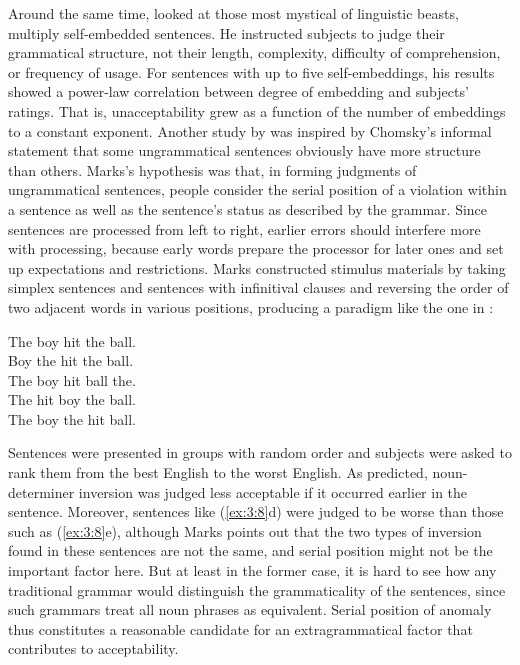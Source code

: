 Around the same time, \citet{Marks1968} looked at those most mystical of linguistic beasts, multiply self-embedded sentences. He instructed subjects to judge their grammatical structure, not their length, complexity, difficulty of comprehension, or frequency of usage. For sentences with up to five self-embeddings, his results showed a power-law correlation between degree of embedding and subjects' ratings. That is, unacceptability grew as a function of the number of embeddings to a constant exponent. Another study by \citet{Marks1965,Marks1967} was inspired by Chomsky's informal statement that some ungrammatical sentences obviously have more structure than others. Marks's hypothesis was that, in forming judgments of ungrammatical sentences, people consider the serial position of a violation within a sentence as well as the sentence's status as described by the grammar. Since sentences are processed from left to right, earlier errors should interfere more with processing, because early words prepare the processor for later ones and set up expectations and restrictions. Marks constructed stimulus materials by taking simplex sentences and sentences with infinitival clauses and reversing the order of two adjacent words in various positions, producing a paradigm like the one in :

\ea\label{ex:3:8}
\ea The boy hit the ball.\\
\ex Boy the hit the ball.\\
\ex The boy hit ball the.\\
\ex The hit boy the ball.\\
\ex The boy the hit ball.\\
\z
\z


\noindent
Sentences were presented in groups with random order and subjects were asked to rank them from the best English to the worst English. As predicted, noun-determiner inversion was judged less acceptable if it occurred earlier in the sentence. Moreover, sentences like (\ref{ex:3:8}d) were judged to be worse than those such as (\ref{ex:3:8}e), although Marks points out that the two types of inversion found in these sentences are not the same, and serial position might not be the important factor here. But at least in the former case, it is hard to see how any traditional grammar would distinguish the grammaticality of the sentences, since such grammars treat all noun phrases as equivalent. Serial position of anomaly thus constitutes a reasonable candidate for an extragrammatical factor that contributes to acceptability. 

